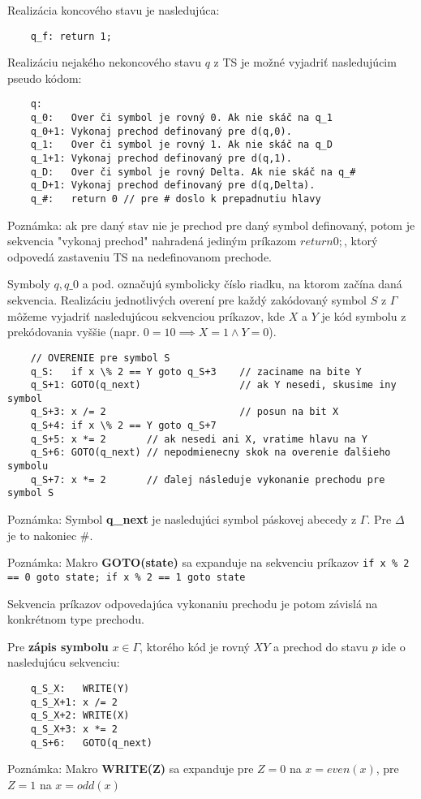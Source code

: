 \documentclass[10pt]{article}
\begin{document}
    Realizácia koncového stavu je nasledujúca:
    \begin{verbatim}
    q_f: return 1;
    \end{verbatim}

    Realizáciu nejakého nekoncového stavu $q$ z TS je možné vyjadriť nasledujúcim pseudo kódom:
    \begin{verbatim}
    q: 
    q_0:   Over či symbol je rovný 0. Ak nie skáč na q_1
    q_0+1: Vykonaj prechod definovaný pre d(q,0). 
    q_1:   Over či symbol je rovný 1. Ak nie skáč na q_D
    q_1+1: Vykonaj prechod definovaný pre d(q,1). 
    q_D:   Over či symbol je rovný Delta. Ak nie skáč na q_#
    q_D+1: Vykonaj prechod definovaný pre d(q,Delta). 
    q_#:   return 0 // pre # doslo k prepadnutiu hlavy
    \end{verbatim}

    Poznámka: ak pre daný stav nie je prechod pre daný symbol definovaný, potom je sekvencia
    "vykonaj prechod" nahradená jediným príkazom $return 0;$, ktorý odpovedá zastaveniu TS na
    nedefinovanom prechode.

    Symboly $q, q\_0$ a pod. označujú symbolicky číslo riadku, na ktorom začína daná sekvencia. 
    Realizáciu jednotlivých overení pre každý zakódovaný symbol $S$ z $\Gamma$ môžeme vyjadriť
    nasledujúcou sekvenciou príkazov, kde $X$ a $Y$ je kód symbolu z prekódovania vyššie (napr. $0 =
    10 \implies X = 1 \land Y = 0$).
    \begin{verbatim}
    // OVERENIE pre symbol S 
    q_S:   if x \% 2 == Y goto q_S+3    // zaciname na bite Y
    q_S+1: GOTO(q_next)                 // ak Y nesedi, skusime iny symbol 
    q_S+3: x /= 2                       // posun na bit X
    q_S+4: if x \% 2 == Y goto q_S+7 
    q_S+5: x *= 2       // ak nesedi ani X, vratime hlavu na Y
    q_S+6: GOTO(q_next) // nepodmienecny skok na overenie ďalšieho symbolu
    q_S+7: x *= 2       // ďalej následuje vykonanie prechodu pre symbol S
    \end{verbatim}
    Poznámka: Symbol \textbf{q\_next} je nasledujúci symbol páskovej abecedy z $\Gamma$. Pre
    $\Delta$ je to nakoniec $\#$.

    Poznámka: Makro \textbf{GOTO(state)} sa expanduje na sekvenciu príkazov \texttt{if x \% 2 == 0 goto
    state; if x \% 2 == 1 goto state} 

    Sekvencia príkazov odpovedajúca vykonaniu prechodu je potom závislá na konkrétnom type prechodu.
    
    Pre \textbf{zápis symbolu} $x \in \Gamma$, ktorého kód je rovný $XY$ a prechod do stavu $p$ ide o
    nasledujúcu sekvenciu:
    \begin{verbatim}
    q_S_X:   WRITE(Y)
    q_S_X+1: x /= 2
    q_S_X+2: WRITE(X)
    q_S_X+3: x *= 2
    q_S+6:   GOTO(q_next)
    \end{verbatim}
    Poznámka: Makro \textbf{WRITE(Z)} sa expanduje pre $Z = 0$ na $x = even(x)$, pre $Z = 1$ na $x = odd(x)$ 
\end{document}
